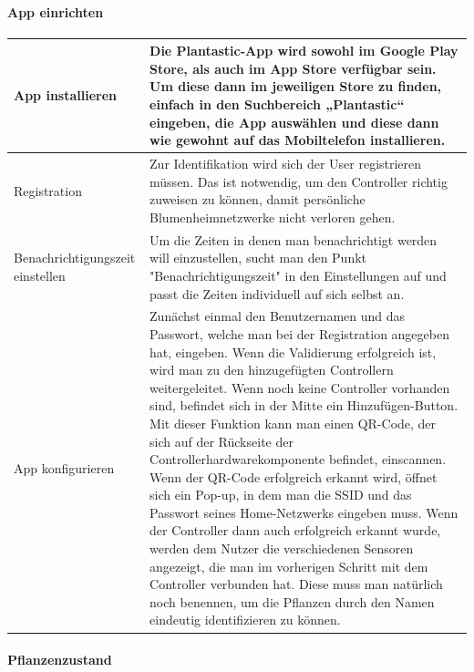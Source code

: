 \documentclass[12pt]{article}
\theoremstyle{definition}
\begin{document}
\paragraph{App einrichten}
\begin{center}

\end{center}
\begin{center}
\begin{tabular}{| L{3cm} | C{12cm} |}
\hline
App installieren & Die Plantastic-App wird sowohl im Google Play Store, als auch im App Store verfügbar sein. Um diese dann im jeweiligen Store zu finden, einfach in den Suchbereich „Plantastic“ eingeben, die App auswählen und diese dann wie gewohnt auf das Mobiltelefon installieren.\\

\hline
Registration & Zur Identifikation wird sich der User registrieren müssen. Das ist notwendig, um den Controller richtig zuweisen zu können, damit persönliche Blumenheimnetzwerke nicht verloren gehen.\\

\hline
Benachrichtigungszeit einstellen & Um die Zeiten in denen man benachrichtigt werden will einzustellen, sucht man den Punkt "Benachrichtigungszeit" in den Einstellungen auf und passt die Zeiten individuell auf sich selbst an. \\

\hline
App konfigurieren & Zunächst einmal den Benutzernamen und das Passwort, welche man bei der Registration angegeben hat, eingeben. Wenn die Validierung erfolgreich ist, wird man zu den hinzugefügten Controllern weitergeleitet. Wenn noch keine Controller vorhanden sind, befindet sich in der Mitte ein Hinzufügen-Button. Mit dieser Funktion kann man einen QR-Code, der sich auf der Rückseite der Controllerhardwarekomponente befindet, einscannen. Wenn der QR-Code erfolgreich erkannt wird, öffnet sich ein Pop-up, in dem man die SSID und das Passwort seines Home-Netzwerks eingeben muss. Wenn der Controller dann auch erfolgreich erkannt wurde, werden dem Nutzer die verschiedenen Sensoren angezeigt, die man im vorherigen Schritt mit dem Controller verbunden hat. Diese muss man natürlich noch benennen, um die Pflanzen durch den Namen eindeutig identifizieren zu können. \\

\hline
\end{tabular}
\end{center}
\newpage


\paragraph{Pflanzenzustand}
\begin{center}

\end{center}
\end{document}
